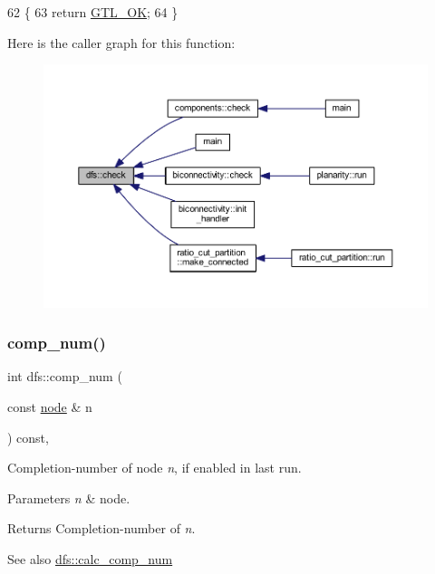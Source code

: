 \begin{DoxyCode}
62 \{
63     \textcolor{keywordflow}{return} \mbox{\hyperlink{classalgorithm_af1a0078e153aa99c24f9bdf0d97f6710a5114c20e4a96a76b5de9f28bf15e282b}{GTL\_OK}};
64 \}
\end{DoxyCode}
Here is the caller graph for this function\+:\nopagebreak
\begin{figure}[H]
\begin{center}
\leavevmode
\includegraphics[width=350pt]{classdfs_a1af70060897529e67910f589b047e576_icgraph}
\end{center}
\end{figure}
\mbox{\label{classdfs_aceb066c806cb0beb5688b167a17387c7}} 
\subsubsection{\texorpdfstring{comp\+\_\+num()}{comp\_num()}}
{\footnotesize\ttfamily int dfs\+::comp\+\_\+num (\begin{DoxyParamCaption}\item[{const \mbox{\hyperlink{classnode}{node}} \&}]{n }\end{DoxyParamCaption}) const\hspace{0.3cm}{\ttfamily [inline]}, {\ttfamily [inherited]}}



Completion-\/number of node {\itshape n}, if enabled in last run. 


\begin{DoxyParams}{Parameters}
{\em n} & node. \\
\hline
\end{DoxyParams}
\begin{DoxyReturn}{Returns}
Completion-\/number of {\itshape n}. 
\end{DoxyReturn}
\begin{DoxySeeAlso}{See also}
\mbox{\hyperlink{classdfs_a70862ea715c52eb95fb704afd3a6e676}{dfs\+::calc\+\_\+comp\+\_\+num}} 
\end{DoxySeeAlso}


